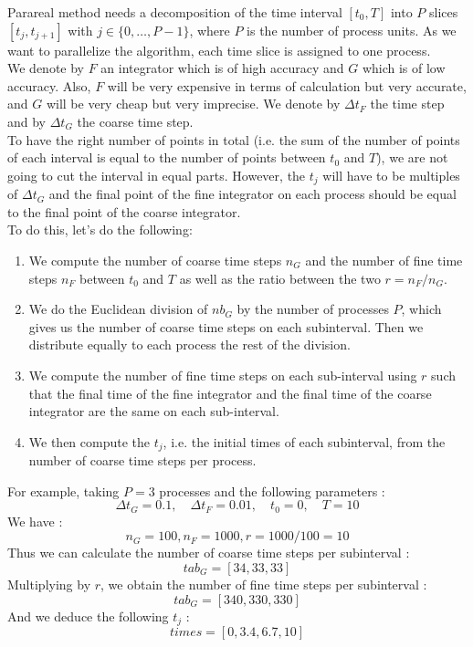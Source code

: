 \noindent Parareal method needs a decomposition of the time interval $[t_0,T]$ into $P$ slices $[t_j,t_{j+1}]$ with  $j\in\{0,\dots,P-1\}$, where $P$ is the number of process units. As we want to parallelize the algorithm, each time slice is assigned to one process. \\
We denote by $F$ an integrator which is of high accuracy and $G$ which is of low accuracy. Also, $F$ will be very expensive in terms of calculation but very accurate, and $G$ will be very cheap but very imprecise. We denote by $\Delta t_F$ the time step and by $\Delta t_G$ the coarse time step. \\
To have the right number of points in total (i.e. the sum of the number of points of each interval is equal to the number of points between $t_0$ and $T$), we are not going to cut the interval in equal parts. However, the $t_j$ will have to be multiples of $\Delta t_G$ and the final point of the fine integrator on each process should be equal to the final point of the coarse integrator. \\
To do this, let's do the following:
\begin{enumerate}[label=\textbullet]
	\item We compute the number of coarse time steps $n_G$ and the number of fine time steps $n_F$ between $t_0$ and $T$ as well as the ratio between the two $r=n_F/n_G$.
	\item We do the Euclidean division of $nb_G$ by the number of processes $P$, which gives us the number of coarse time steps on each subinterval. Then we distribute equally to each process the rest of the division.
	\item We compute the number of fine time steps on each sub-interval using $r$ such that the final time of the fine integrator and the final time of the coarse integrator are the same on each sub-interval.
	\item We then compute the $t_j$, i.e. the initial times of each subinterval, from the number of coarse time steps per process.
\end{enumerate}
For example, taking $P=3$ processes and the following parameters :
$$\Delta t_G=0.1, \quad \Delta t_F=0.01, \quad t_0=0, \quad T=10$$ 
We have :
$$n_G=100, n_F=1000, r=1000/100=10$$
Thus we can calculate the number of coarse time steps per subinterval :
$$tab_G = [34,33,33]$$
Multiplying by $r$, we obtain the number of fine time steps per subinterval :
$$tab_G = [340,330,330]$$
And we deduce the following $t_j$ :
$$times = [0,3.4,6.7,10]$$

